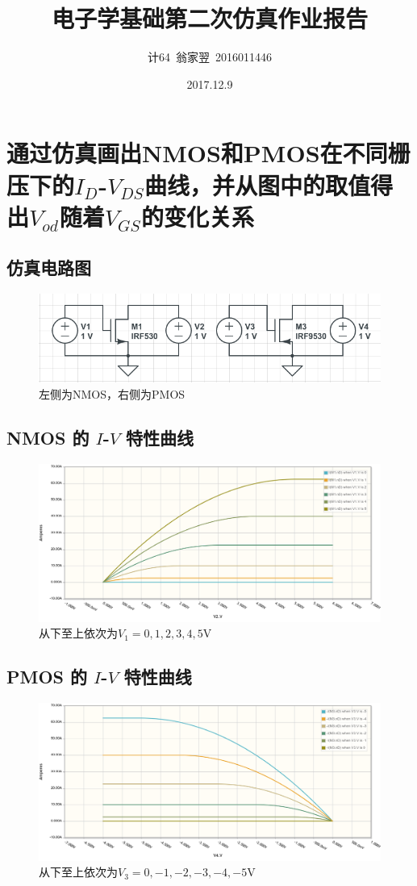 \documentclass[a4paper]{article}
\title{\bf 电子学基础第二次仿真作业报告}
\date{2017.12.9}
\author{计64~翁家翌~2016011446}
\begin{document}
\kaishu
\ttfamily
\maketitle
\section{通过仿真画出NMOS和PMOS在不同栅压下的$I_D$-$V_{DS}$曲线，并从图中的取值得出$V_{od}$随着$V_{GS}$的变化关系}
\subsection{仿真电路图}
\begin{figure}[htp]
\centering
\includegraphics[width=1.0\linewidth]{01.png}
\caption{左侧为NMOS，右侧为PMOS}
\end{figure}
\subsection{NMOS 的 $I$-$V$ 特性曲线}
\begin{figure}[htp]
\centering
\includegraphics[width=1.0\linewidth]{1.png}
\caption{从下至上依次为$V_1=0,1,2,3,4,5$V}
\label{fig:1}
\end{figure}
\subsection{PMOS 的 $I$-$V$ 特性曲线}
\begin{figure}[htp]
\centering
\includegraphics[width=1.0\linewidth]{2.png}
\caption{从下至上依次为$V_3=0,-1,-2,-3,-4,-5$V}
\label{fig:2}
\end{figure}
\end{document}
